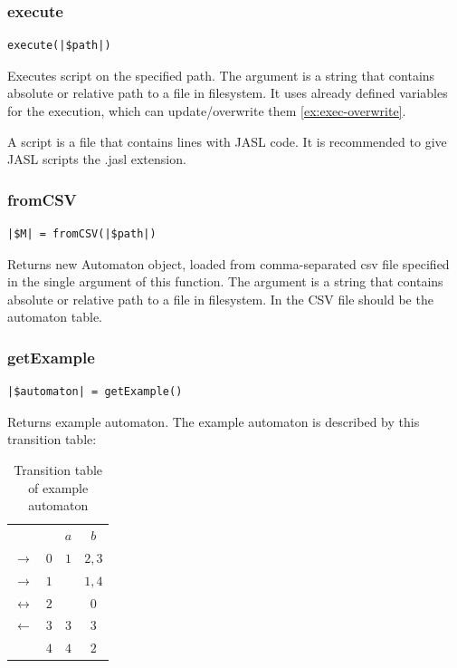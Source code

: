 \documentclass{ctuthesis}
\begin{document}
\subsubsection{execute}
\label{subsec:execute}
\begin{lstlisting}[language = JASL_snippet]
	execute(|$path|)
\end{lstlisting}

Executes script on the specified path. The argument is a string that contains absolute or relative path to a file in filesystem. It uses already defined variables for the execution, which can update/overwrite them \ref{ex:exec-overwrite}.

A script is a file that contains lines with JASL code. It is recommended to give JASL scripts the .jasl extension.

\subsubsection{fromCSV}
\begin{lstlisting}[language = JASL_snippet]
	|$M| = fromCSV(|$path|)
\end{lstlisting}

Returns new Automaton object, loaded from comma-separated csv file specified in the single argument of this function. The argument is a string that contains absolute or relative path to a file in filesystem. In the CSV file should be the automaton table.

\subsubsection{getExample}
\begin{lstlisting}[language = JASL_snippet]
	|$automaton| = getExample()
\end{lstlisting}

Returns example automaton. The example automaton is described by this transition table:
\begin{table}[H]
\begin{ctucolortab}
\begin{tabular}{cc|c|c}
	 & & $a$ & $b$ \\\Midrule
	$\rightarrow$ & $0$ & $1$ & $2,3$ \\
	$\rightarrow$ & $1$ & & $1,4$ \\
	$\leftrightarrow$ & $2$ & & $0$ \\
	$\leftarrow$ & $3$ & $3$ & $3$ \\
	 & $4$ & $4$ & $2$ 
\end{tabular}
\end{ctucolortab}
\caption{Transition table of example automaton}
\label{fig:example_automaton_table}
\end{table}
\end{document}
